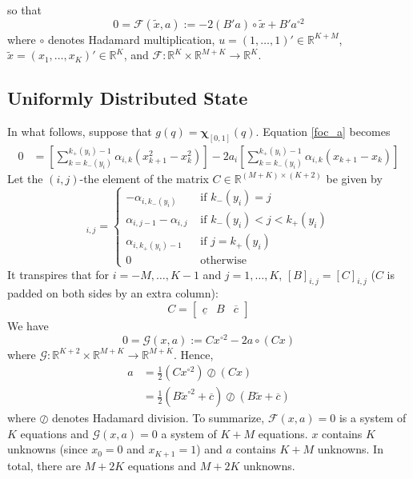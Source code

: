 \documentclass[12pt]{article}
\begin{document}
so that
\begin{equation}
	0=\mathcal{F}(\widetilde{x},a):=-2(B'a)\circ\widetilde{x}+B'a^{\circ 2}\label{eq:F_map}
\end{equation}
where $\circ$ denotes Hadamard multiplication, $u=(1,\ldots,1)'\in\mathbb{R}^{K+M}$, $\widetilde{x}=(x_{1},\ldots,x_{K})'\in\mathbb{R}^{K}$, and $\mathcal{F}:\mathbb{R}^{K}\times\mathbb{R}^{M+K}\rightarrow\mathbb{R}^{K}$. 
\subsection{Uniformly Distributed State}
In what follows, suppose that $g(q)=\mathbf{\chi}_{[0,1]}(q)$. Equation \ref{foc_a} becomes
\begin{align}
	0&=\left[\sum_{k=k_{-}(y_{i})}^{k_{+}(y_{i})-1}{\alpha_{i,k}\left(x_{k+1}^{2}-x_{k}^{2}\right)}\right]-2a_{i}\left[\sum_{k=k_{-}(y_{i})}^{k_{+}(y_{i})-1}{\alpha_{i,k}(x_{k+1}-x_{k})}\right]
\end{align}
Let the $(i,j)$-the element of the matrix $C\in\mathbb{R}^{(M+K)\times(K+2)}$ be given by
\begin{equation}
	[C]_{i,j}=
	\begin{cases}
		-\alpha_{i,k_{-}(y_{i})} & \text{ if } k_{-}(y_{i})=j \\
		\alpha_{i,j-1}-\alpha_{i,j} & \text{ if } k_{-}(y_{i})<j<k_{+}(y_{i})\\
		\alpha_{i,k_{+}(y_{i})-1} & \text{ if } j=k_{+}(y_{i})\\
		0 & \text{ otherwise }
	\end{cases}
\end{equation}
It transpires that for $i=-M,\ldots,K-1$ and $j=1,\ldots,K$, $[B]_{i,j}=[C]_{i,j}$ ($C$ is padded on both sides by an extra column): 
\begin{equation}
	C = 
	\left[
		\begin{array}{ccc}
			\underline{c} & B & \overline{c}
		\end{array}
	\right]
\end{equation}
We have 
\begin{equation}\label{eq:G_map}
	0=\mathcal{G}(x,a):=Cx^{\circ 2}-2a\circ (Cx)
\end{equation}
where $\mathcal{G}:\mathbb{R}^{K+2}\times\mathbb{R}^{M+K}\rightarrow\mathbb{R}^{M+K}$. Hence,
\begin{align}
	a&=\frac{1}{2}(Cx^{\circ 2})\oslash(Cx)\\
	&=\frac{1}{2}(B\widetilde{x}^{\circ 2}+\overline{c})\oslash(B\widetilde{x}+\overline{c})
\end{align}
where $\oslash$ denotes Hadamard division. To summarize, $\mathcal{F}(x,a)=0$ is a system of $K$ equations and $\mathcal{G}(x,a)=0$ a system of $K+M$ equations. $x$ contains $K$ unknowns (since $x_{0}=0$ and $x_{K+1}=1$) and $a$ contains $K+M$ unknowns. In total, there are $M+2K$ equations and $M+2K$ unknowns. 
\end{document}
